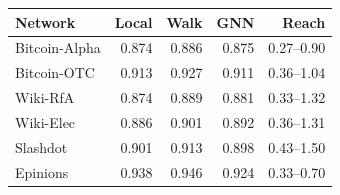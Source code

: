 \begin{tabular}{@{}lrrrr@{}}
\toprule
Network & Local & Walk & GNN & Reach \\
\midrule
Bitcoin-Alpha & 0.874 & 0.886 & 0.875 & 0.27--0.90 \\
Bitcoin-OTC & 0.913 & 0.927 & 0.911 & 0.36--1.04 \\
Wiki-RfA & 0.874 & 0.889 & 0.881 & 0.33--1.32 \\
Wiki-Elec & 0.886 & 0.901 & 0.892 & 0.36--1.31 \\
Slashdot & 0.901 & 0.913 & 0.898 & 0.43--1.50 \\
Epinions & 0.938 & 0.946 & 0.924 & 0.33--0.70 \\
\bottomrule
\end{tabular}
